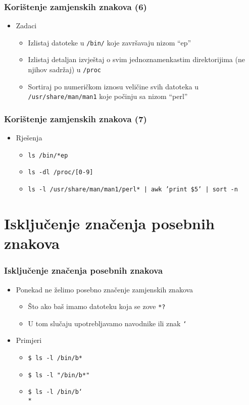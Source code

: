 \documentclass[table,usenames,dvipsnames]{beamer}
\newcommand{\shell}[1]{\texttt{#1}}
\begin{document}
\begin{frame}[t]
\frametitle{Korištenje zamjenskih znakova (6)}
\begin{itemize}
  \item Zadaci
  \begin{itemize}
    \item Izlistaj datoteke u \shell{/bin/} koje završavaju nizom ``ep''
    \item Izlistaj detaljan izvještaj o svim jednoznamenkastim 
          direktorijima (ne njihov sadržaj) u \shell{/proc}
    \item Sortiraj po numeričkom iznosu veličine svih datoteka u 
          \shell{/usr/share/man/man1} koje počinju sa nizom “perl”
  \end{itemize}
\end{itemize}
\end{frame}

\begin{frame}[t]
\frametitle{Korištenje zamjenskih znakova (7)}
\begin{itemize}
  \item Rješenja
  \begin{itemize}
    \item \shell{ls /bin/*ep}
    \item \shell{ls -dl /proc/[0-9]}
    \item \shell{ls -l /usr/share/man/man1/perl* | awk '{print \$5}' | sort -n}
  \end{itemize}
\end{itemize}
\end{frame}

\section{Isključenje značenja posebnih znakova}
\begin{frame}[t]
\frametitle{Isključenje značenja posebnih znakova}
\begin{itemize}
  \item Ponekad ne želimo posebno značenje zamjenskih znakova
  \begin{itemize}
    \item Što ako baš imamo datoteku koja se zove \shell{*?}
    \item U tom slučaju upotrebljavamo navodnike ili znak 
          \shell{\char`\\}
  \end{itemize}
  \item Primjeri
  \begin{itemize}
    \item[] \shell{\$ ls -l /bin/b*}
    \item[] \shell{\$ ls -l "/bin/b*"}
    \item[] \shell{\$ ls -l /bin/b\char`\\{}*}
  \end{itemize}
\end{itemize}
\end{frame}
\end{document}
